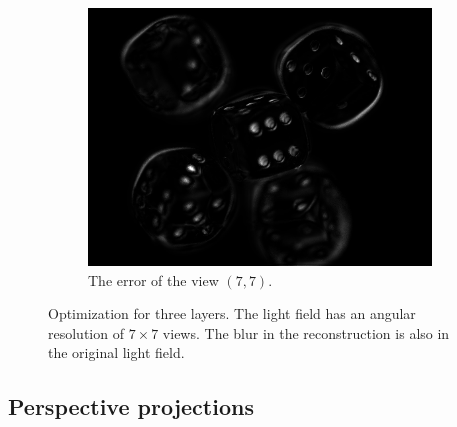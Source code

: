 \documentclass[11pt,a4paper,titlepage]{article}
\begin{document}
\begin{figure}[h]
\begin{subfigure}[t]{0.4\textwidth}
		\includegraphics[width=\textwidth]{results/dice_orthographic_rec_fov10_blurry_3Layers/custom_view_error.png}
		\caption{The error of the view $\left( 7, 7 \right)$.}
	\end{subfigure}

	\caption{Optimization for three layers. The light field has an angular resolution of $7\times 7$ views. The blur in the reconstruction is also in the original light field.}
\end{figure}

\newpage
\subsection{Perspective projections}
\end{document}
